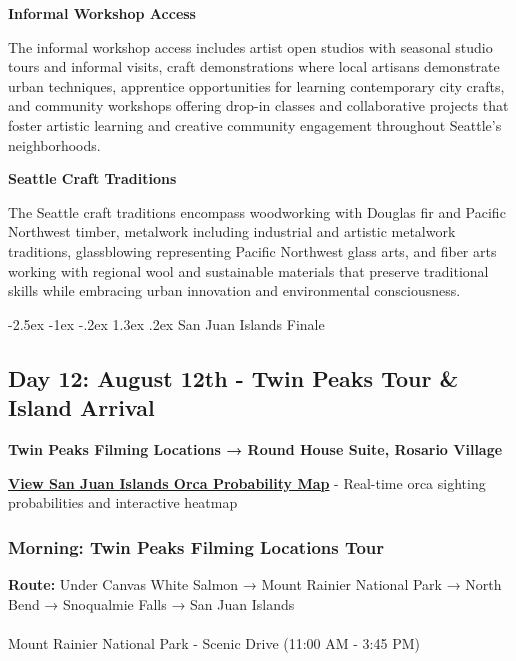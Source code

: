 \documentclass[
  11pt,
  letterpaper,
  DIV=10,
  numbers=noendperiod]{scrartcl}
\makeatletter
\let\oldparagraph\paragraph
\renewcommand{\paragraph}{
    \@ifstar
      \xxxParagraphStar
      \xxxParagraphNoStar
  }
\newcommand{\xxxParagraphStar}[1]{\oldparagraph*{#1}\mbox{}}
\newcommand{\xxxParagraphNoStar}[1]{\oldparagraph{#1}\mbox{}}
\renewcommand{\section}{\@startsection{section}{1}{\z@}%
  {-2.5ex \@plus -1ex \@minus -.2ex}%
  {1.3ex \@plus .2ex}%
  {\normalfont\fontsize{16}{19}\bfseries\color{twinpeaksred}}}
\makeatother
\begin{document}
\textbf{Informal Workshop Access}

The informal workshop access includes artist open studios with seasonal
studio tours and informal visits, craft demonstrations where local
artisans demonstrate urban techniques, apprentice opportunities for
learning contemporary city crafts, and community workshops offering
drop-in classes and collaborative projects that foster artistic learning
and creative community engagement throughout Seattle's neighborhoods.

\textbf{Seattle Craft Traditions}

The Seattle craft traditions encompass woodworking with Douglas fir and
Pacific Northwest timber, metalwork including industrial and artistic
metalwork traditions, glassblowing representing Pacific Northwest glass
arts, and fiber arts working with regional wool and sustainable
materials that preserve traditional skills while embracing urban
innovation and environmental consciousness.

\newpage

\section{San Juan Islands Finale}\label{san-juan-islands-finale}

\subsection{Day 12: August 12th - Twin Peaks Tour \& Island
Arrival}\label{day-12-august-12th---twin-peaks-tour-island-arrival}

\textbf{Twin Peaks Filming Locations → Round House Suite, Rosario
Village}

\textbf{\href{https://orcast.org}{View San Juan Islands Orca Probability
Map}} - Real-time orca sighting probabilities and interactive heatmap

\subsubsection{Morning: Twin Peaks Filming Locations
Tour}\label{morning-twin-peaks-filming-locations-tour}

\textbf{Route:} Under Canvas White Salmon → Mount Rainier National Park
→ North Bend → Snoqualmie Falls → San Juan Islands

\paragraph{Mount Rainier National Park - Scenic Drive (11:00 AM - 3:45
PM)}\label{mount-rainier-national-park---scenic-drive-1100-am---345-pm}
\end{document}
